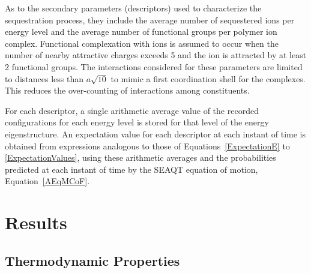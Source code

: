 \documentclass[
journal=jcisd8, %
manuscript=article,
layout=twocolumn   %
]{achemso}
\begin{document}
As to the secondary parameters (descriptors) used to characterize the sequestration process, they include the average number of sequestered ions per energy level and the average number of functional groups per polymer ion complex. Functional complexation with ions is assumed to occur when the number of nearby attractive charges exceeds 5 and the ion is attracted by at least 2 functional groups. The interactions considered for these parameters are limited to distances less than $a\sqrt{10}$ to mimic a first coordination shell for the complexes. This reduces the over-counting of interactions among constituents. 

For each descriptor, a single arithmetic average value of the recorded configurations for each energy level is stored for that level of the energy eigenstructure. An expectation value for each descriptor at each instant of time is obtained from expressions analogous to those of Equations~\ref{ExpectationE} to \ref{ExpectationValues}, using these arithmetic averages and the probabilities  predicted at each instant of time by the SEAQT equation of motion, Equation~\ref{AEqMCoF}. 

\section{Results}\label{SectionIII}

\subsection{Thermodynamic Properties}
\end{document}
